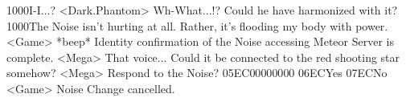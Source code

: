 {10}{00}I-I...? 
<Dark.Phantom> Wh-What...!? 
Could he have harmonized with it? 
{10}{00}The Noise isn't hurting at all. Rather, it's flooding my body with power. 
<Game> *beep* 
Identity confirmation of the Noise accessing Meteor Server is complete. 
<Mega> That voice... Could it be connected to the red shooting star somehow? 
<Mega> Respond to the Noise? {05}{EC}{00}{00}{00}{00}  {06}{EC}Yes  {07}{EC}No 
<Game> Noise Change cancelled. 
